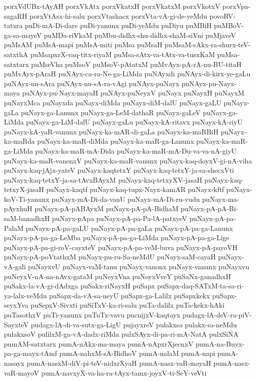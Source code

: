 {porxVdUBx-tAyAH
porxVkAtx
porxVkatxH
porxVkatxM
porxVkotxV
porxVpa-sagaRH
porxVtAsx-hi-salu
porxVtashacx
porxVta-vA-gi-de-yeMdu
povoRV-tatxra
puDi-mA-Di-dare
puDi-yanunx
puDi-yeMdu
puDiyu
puMBiH
puMBoV-ga-sa-mayeV
puMDa-riVkaM
puMbu-didhx-shu-didhx-shaM-siVni
puMjaveV
puMsAM
puMsA-mapi
puMsA-miti
puMsa
puMsaH
puMsaM-sAkx-ra-shurx-teV-satxthA
puMsapxrX-vaq-titx-riyaM
puMsa-sAtx-va-tAtx-va-tusxKaM
puMsa-satxtarx
puMseVha
puMsoV
puMsoV-pAtatxM
puMvAyx-pA-rA-nu-BU-titaH
puMvAyx-pAraH
puNAyx-ca-ra-Ne-ga-LiMda
puNAyxdi
puNAyx-di-kirx-ye-gaLu
puNAyx-nu-sAra
puNAyx-nu-sA-ra-vAgi
puNAyx-puNayx
puNAyx-pu-Nayx-maya
puNAyx-pu-Nayx-mayaH
puNAyx-puNeyxV
puNayx
puNayxH
puNayxM
puNayxMca
puNayxda
puNayx-diMda
puNayx-diM-dalU
puNayx-gaLU
puNayx-gaLa
puNayx-ga-Lanunx
puNayx-ga-LeM-dathaR
puNayx-gaLeV
puNayx-ga-LiMda
puNayx-ga-LiM-dalU
puNayx-gaLu
puNayx-kA-ritavx
puNayx-kA-riyU
puNayx-kA-yaR-vanunx
puNayx-ka-mAR-di-gaLa
puNayx-ka-maRBiH
puNayx-ka-maRda
puNayx-ka-maR-diMda
puNayx-ka-maR-ga-Lanunx
puNayx-ka-maR-ga-LiMda
puNayx-ka-maR-mA-Dida
puNayx-ka-maR-mA-Du-va-va-nA-giyU
puNayx-ka-maR-vanenxV
puNayx-ka-maR-vanunx
puNayx-kaq-doyxV-gi-nA-viha
puNayx-kaq-jAjx-yateV
puNayx-kaqtetxY
puNayx-kaq-tetxY-ja-sa-shecxVti
puNayx-kaq-tetxY-ja-sa-tAvxBAyxM
puNayx-kaq-tetxyXV-jasaH
puNayx-kaq-tetxyX-jasaH
puNayx-kaqtf
puNayx-kaq-tupx-Nayx-kamAR
puNayx-kftf
puNayx-koV-Ti-yanunx
puNayx-mA-Di-da-vanU
puNayx-mA-Di-ru-vudu
puNayx-ma-pAyxhuH
puNayx-pA-pABAyxM
puNayx-pA-pA-BidhaM
puNayx-pA-pA-Bi-saM-banadhxH
puNayx-pApa
puNayx-pA-pa-Pa-lA-patxyeV
puNayx-pA-pa-PalaM
puNayx-pA-pa-gaLU
puNayx-pA-pa-gaLa
puNayx-pA-pa-ga-Lanunx
puNayx-pA-pa-ga-LeMba
puNayx-pA-pa-ga-LiMda
puNayx-pA-pa-ga-Lige
puNayx-pA-pa-gi-roV-cayxteV
puNayx-pA-pa-veM-buva
puNayx-pA-payoVH
puNayx-pA-poVtathxM
puNayx-pu-ru-Sa-neMdU
puNayx-saM-cayaH
puNayx-vA-gali
puNayxvU
puNayx-vaM-tanu
puNayx-vanonx
puNayx-vanunx
puNayxvu
puNeyxV-nA-na-nAvx-gataM
puNeyxVna
puNoyxVveY
puSaNx-ganadhxH
puSakx-la-vA-gi-dAdxga
puSakx-riNayxH
puSapx
puSapx-daq-SATxM-ta-sa-ri-ya-lalx-veMdu
puSapx-da-vA-sa-neyU
puSapx-ga-Lalilx
puSapxkekx
puSapx-seyxYva
puSepxV-Sivxti
puSiTxV-ka-ri-salu
puTa-dalilx
puTa-kekx-hAki
puTasothxV
puTi-yanunx
puTuTx-vavu
pucnijxV-kaqtayx
pudagx-lA-deV-ra-piV-SayxteV
pudagx-lA-di-va-sutx-ga-LigU
pujayxreV
pulakxsa
pulakx-sa-neMdu
pulakxsoV
pulilxM-ga-vA-dadx-riMda
pulxSAyx-di-pa-ri-mA-NatA
pulxSiNA
pumAM-satxtarx
pumA-nAkx-ma-maya
pumA-nApxrXjecnxV
pumA-na-Buyx-pa-ga-mayx-tAmf
pumA-nahxM-sA-BidhoV
pumA-nalaM
pumA-napi
pumA-nasayx
pumA-nasxM-diV-pi-teV-nidxrXyaH
pumA-nasx-vaR-mayaH
pumA-nasx-vaR-mayoV
pumA-navxyX-va-ha-ra-tAyx-tamx-joyxV-ti-SeY-veVti
}
